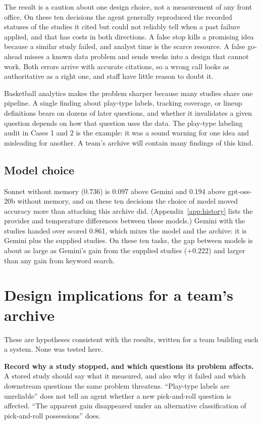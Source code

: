 \documentclass[11pt]{article}
\begin{document}
The result is a caution about one design choice, not a measurement of any front office. On these ten decisions the agent generally reproduced the recorded statuses of the studies it cited but could not reliably tell when a past failure applied, and that has costs in both directions. A false stop kills a promising idea because a similar study failed, and analyst time is the scarce resource. A false go-ahead misses a known data problem and sends weeks into a design that cannot work. Both errors arrive with accurate citations, so a wrong call looks as authoritative as a right one, and staff have little reason to doubt it.

Basketball analytics makes the problem sharper because many studies share one pipeline. A single finding about play-type labels, tracking coverage, or lineup definitions bears on dozens of later questions, and whether it invalidates a given question depends on how that question uses the data. The play-type labeling audit in Cases 1 and 2 is the example: it was a sound warning for one idea and misleading for another. A team's archive will contain many findings of this kind.

\subsection{Model choice}

Sonnet without memory (0.736) is 0.097 above Gemini and 0.194 above gpt-oss-20b without memory, and on these ten decisions the choice of model moved accuracy more than attaching this archive did. (Appendix~\ref{app:history} lists the provider and temperature differences between these models.) Gemini with the studies handed over scored 0.861, which mixes the model and the archive: it is Gemini plus the supplied studies. On these ten tasks, the gap between models is about as large as Gemini's gain from the supplied studies ($+0.222$) and larger than any gain from keyword search.

\section{Design implications for a team's archive}
\label{sec:practical}

These are hypotheses consistent with the results, written for a team building such a system. None was tested here.

\textbf{Record why a study stopped, and which questions its problem affects.} A stored study should say what it measured, and also why it failed and which downstream questions the same problem threatens. ``Play-type labels are unreliable'' does not tell an agent whether a new pick-and-roll question is affected. ``The apparent gain disappeared under an alternative classification of pick-and-roll possessions'' does.
\end{document}
